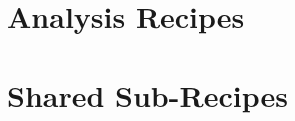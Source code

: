 \documentclass[11pt,a4paper]{scrreprt}
\begin{document}
\toxtitlepage

\tableofcontents
\cleardoublepage

\part{Analysis Recipes}





\part{Shared Sub-Recipes}






\end{document}
